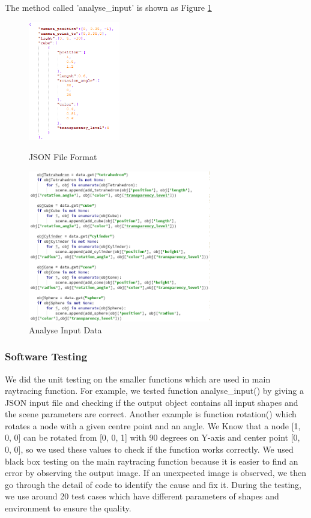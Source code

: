 \documentclass[a4paper, 12pt]{article}
\begin{document}
The method called 'analyse\_input' is shown as Figure \ref{fig:Analyse Input Data}

\begin{figure}[htbp]
\centering
\begin{minipage}[t]{0.38\textwidth}
\centering
\includegraphics[width=4cm]{data_format.png}
\caption{JSON File Format}
\label{fig:JSON File Format}
\end{minipage}
\begin{minipage}[t]{0.48\textwidth}
\centering
\includegraphics[width=8cm]{json_analyse.png}
\caption{Analyse Input Data}
\label{fig:Analyse Input Data}
\end{minipage}
\end{figure}

\subsubsection{Software Testing}
We did the unit testing on the smaller functions which are used in main raytracing function. For example, we tested function analyse\_input() by giving a JSON input file and checking if the output object contains all input shapes and the scene parameters are correct. Another example is function rotation() which rotates a node with a given centre point and an angle. We Know that a node [1, 0, 0] can be rotated from [0, 0, 1] with 90 degrees on Y-axis and center point [0, 0, 0], so we used these values to check if the function works correctly. We used black box testing on the main raytracing function because it is easier to find an error by observing the output image. If an unexpected image is observed, we then go through the detail of code to identify the cause and fix it. During the testing, we use around 20 test cases which have different parameters of shapes and environment to ensure the quality. 
\end{document}
